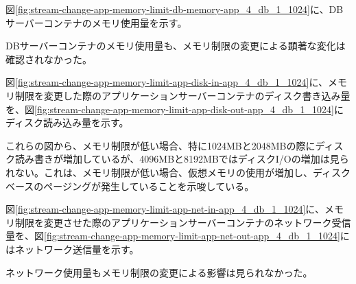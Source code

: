\documentclass[../../../../main]{subfiles}
\begin{document}
    図\ref{fig:stream-change-app-memory-limit-db-memory-app_4_db_1_1024}に、DBサーバーコンテナのメモリ使用量を示す。

    

    DBサーバーコンテナのメモリ使用量も、メモリ制限の変更による顕著な変化は確認されなかった。


    図\ref{fig:stream-change-app-memory-limit-app-disk-in-app_4_db_1_1024}に、メモリ制限を変更した際のアプリケーションサーバーコンテナのディスク書き込み量を、図\ref{fig:stream-change-app-memory-limit-app-disk-out-app_4_db_1_1024}にディスク読み込み量を示す。

    
    

    これらの図から、メモリ制限が低い場合、特に1024MBと2048MBの際にディスク読み書きが増加しているが、4096MBと8192MBではディスクI/Oの増加は見られない。これは、メモリ制限が低い場合、仮想メモリの使用が増加し、ディスクベースのページングが発生していることを示唆している。


    図\ref{fig:stream-change-app-memory-limit-app-net-in-app_4_db_1_1024}に、メモリ制限を変更させた際のアプリケーションサーバーコンテナのネットワーク受信量を、図\ref{fig:stream-change-app-memory-limit-app-net-out-app_4_db_1_1024}にはネットワーク送信量を示す。

    
    

    ネットワーク使用量もメモリ制限の変更による影響は見られなかった。
\end{document}
